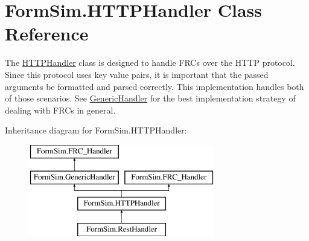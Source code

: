\hypertarget{class_form_sim_1_1_h_t_t_p_handler}{}\section{Form\+Sim.\+H\+T\+T\+P\+Handler Class Reference}
\label{class_form_sim_1_1_h_t_t_p_handler}


The \mbox{\hyperlink{class_form_sim_1_1_h_t_t_p_handler}{H\+T\+T\+P\+Handler}} class is designed to handle F\+R\+Cs over the H\+T\+TP protocol. Since this protocol uses key value pairs, it is important that the passed arguments be formatted and parsed correctly. This implementation handles both of those scenarios. See \mbox{\hyperlink{class_form_sim_1_1_generic_handler}{Generic\+Handler}} for the best implementation strategy of dealing with F\+R\+Cs in general.  


Inheritance diagram for Form\+Sim.\+H\+T\+T\+P\+Handler\+:\begin{figure}[H]
\begin{center}
\leavevmode
\includegraphics[height=4.000000cm]{class_form_sim_1_1_h_t_t_p_handler}
\end{center}
\end{figure}
